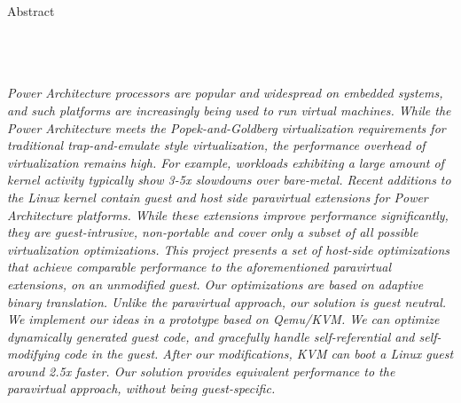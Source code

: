 \begin{center}
\LARGE{Abstract}
\end{center}
\ \\ \ \\ \ \\
{\it Power Architecture processors are popular and widespread on embedded systems, and such platforms are increasingly being used to run virtual machines\cite{embedded_virtualization, KVM_on_embedded_Power}. While the Power Architecture meets the Popek-and-Goldberg virtualization requirements for traditional trap-and-emulate style virtualization, the performance overhead of virtualization remains high. For example, workloads exhibiting a large amount of kernel activity typically show 3-5x slowdowns over bare-metal.\newline
Recent additions to the Linux kernel contain guest and host side paravirtual extensions for Power Architecture platforms. While these extensions improve performance significantly, they are guest-intrusive, non-portable and cover only a subset of all possible virtualization optimizations.\newline
This project presents a set of host-side optimizations that achieve comparable performance to the aforementioned paravirtual extensions, on an unmodified guest. Our optimizations are based on adaptive binary translation. Unlike the paravirtual approach, our solution is guest neutral. We implement our ideas in a prototype based on Qemu/KVM. We can optimize dynamically generated guest code, and gracefully handle self-referential and self-modifying code in the guest. After our modifications, KVM can boot a Linux guest around 2.5x faster. Our solution provides equivalent performance to the paravirtual approach, without being guest-specific.
}

